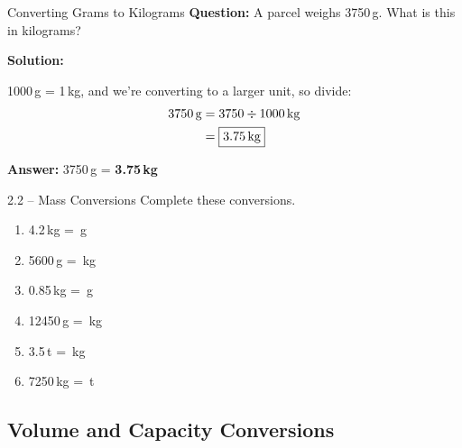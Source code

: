 \documentclass[12pt,a4paper]{article}
\begin{document}
\begin{examplebox}{Converting Grams to Kilograms}
\textbf{Question:} A parcel weighs 3750\,g. What is this in kilograms?

\textbf{Solution:}

1000\,g = 1\,kg, and we're converting to a larger unit, so divide:
\begin{align*}
3750\text{\,g} &= 3750 \div 1000\text{\,kg} \\
&= \boxed{3.75\text{\,kg}}
\end{align*}

\textbf{Answer:} 3750\,g = \textbf{3.75\,kg}
\end{examplebox}

\begin{exercisebox}{2.2 -- Mass Conversions}
Complete these conversions.

\begin{enumerate}[leftmargin=*]
\item 4.2\,kg = \underline{\hspace{3cm}}\,g
\item 5600\,g = \underline{\hspace{3cm}}\,kg
\item 0.85\,kg = \underline{\hspace{3cm}}\,g
\item 12450\,g = \underline{\hspace{3cm}}\,kg
\item 3.5\,t = \underline{\hspace{3cm}}\,kg
\item 7250\,kg = \underline{\hspace{3cm}}\,t
\end{enumerate}
\end{exercisebox}

\subsection{Volume and Capacity Conversions}
\end{document}
